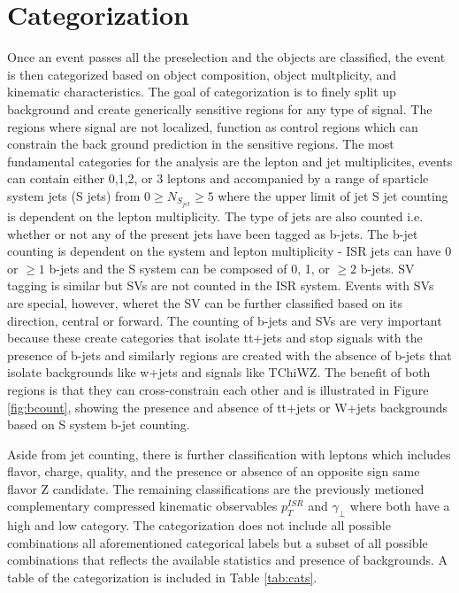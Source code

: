 \section{Categorization}

Once an event passes all the preselection and the objects are classified, the event is then categorized based on object composition, object multplicity, and kinematic characteristics. The goal of categorization is to finely split up background and create generically sensitive regions for any type of signal. The regions where signal are not localized, function as control regions which can constrain the back ground prediction in the sensitive regions. The most fundamental categories for the analysis are the lepton and jet multiplicites, events can contain either 0,1,2, or 3 leptons and accompanied by a range of sparticle system jets (S jets) from $0\geq N_{S_{jet}} \geq 5$ where the upper limit of jet S jet counting is dependent on the lepton multiplicity. The type of jets are also counted i.e. whether or not any of the present jets have been tagged as b-jets. The b-jet counting is dependent on the system and lepton multiplicity - ISR jets can have 0 or $\geq 1$ b-jets and the S system can be composed of 0, 1, or $\geq2$ b-jets. SV tagging is similar but SVs are not counted in the ISR system. Events with SVs are special, however, wheret the SV can be further classified based on its direction, central or forward. The counting of b-jets and SVs are very important because these create categories that isolate tt+jets and stop signals with the presence of b-jets and similarly regions are created with the absence of b-jets that isolate backgrounds like w+jets and signals like TChiWZ. The benefit of both regions is that they can cross-constrain each other and is illustrated in Figure \ref{fig:bcount}, showing the presence and absence of tt+jets or W+jets backgrounds based on S system b-jet counting.

Aside from jet counting, there is further classification with leptons which includes flavor, charge, quality, and the presence or absence of an opposite sign same flavor Z candidate. The remaining classifications are the previously metioned complementary compressed kinematic observables $p_T^{ISR}$ and $\gamma_\perp$ where both have a high and low category.  The categorization does not include all possible combinations all aforementioned categorical labels but a subset of all possible combinations that reflects the available statistics and presence of backgrounds. A  table of the categorization is included in Table \ref{tab:cats}. 

